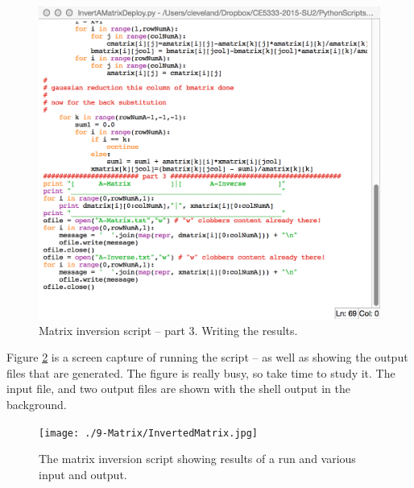 \begin{figure}[h!] %
   \centering
   \includegraphics[width=6in]{./9-Matrix/InversionThree.jpg} 
   \caption{Matrix inversion script -- part 3.  Writing the results.}
   \label{fig:InversionThree}
\end{figure}
\clearpage

Figure \ref{fig:InvertedMatrix} is a screen capture of running the script -- as well as showing the output files that are generated.  The figure is really busy, so take time to study it.   The input file, and two output files are shown with the shell output in the background.

\begin{figure}[h!] %
   \centering
   \texttt{[image: ./9-Matrix/InvertedMatrix.jpg]} 
   \caption{The matrix inversion script  showing results of a run and various input and output.}
   \label{fig:InvertedMatrix}
\end{figure}
\clearpage


